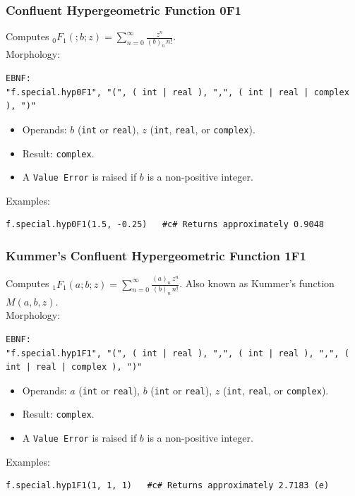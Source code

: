 \subsubsection{Confluent Hypergeometric Function 0F1}
Computes ${}_0F_1(; b; z) = \sum_{n=0}^{\infty} \frac{z^n}{(b)_n\, n!}$. \\
Morphology:
\begin{verbatim}
EBNF:
"f.special.hyp0F1", "(", ( int | real ), ",", ( int | real | complex ), ")"
\end{verbatim}
\begin{itemize}
\item Operands: $b$ (\texttt{int} or \texttt{real}), $z$ (\texttt{int}, \texttt{real}, or \texttt{complex}).
\item Result: \texttt{complex}.
\item A \texttt{Value Error} is raised if $b$ is a non-positive integer.
\end{itemize}
Examples:
\begin{verbatim}
f.special.hyp0F1(1.5, -0.25)   #c# Returns approximately 0.9048
\end{verbatim}

\subsubsection{Kummer's Confluent Hypergeometric Function 1F1}
Computes ${}_1F_1(a; b; z) = \sum_{n=0}^{\infty} \frac{(a)_n\, z^n}{(b)_n\, n!}$. Also known as Kummer's function $M(a, b, z)$. \\
Morphology:
\begin{verbatim}
EBNF:
"f.special.hyp1F1", "(", ( int | real ), ",", ( int | real ), ",", ( int | real | complex ), ")"
\end{verbatim}
\begin{itemize}
\item Operands: $a$ (\texttt{int} or \texttt{real}), $b$ (\texttt{int} or \texttt{real}), $z$ (\texttt{int}, \texttt{real}, or \texttt{complex}).
\item Result: \texttt{complex}.
\item A \texttt{Value Error} is raised if $b$ is a non-positive integer.
\end{itemize}
Examples:
\begin{verbatim}
f.special.hyp1F1(1, 1, 1)   #c# Returns approximately 2.7183 (e)
\end{verbatim}

